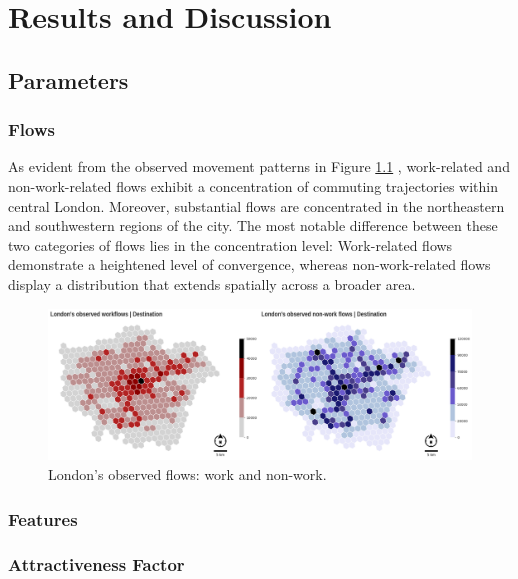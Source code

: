 \chapter{Results and Discussion}
\label{chapterlabel4}
    \section{Parameters}
        \subsection{Flows}

        As evident from the observed movement patterns in Figure \ref{fig: observedflows_overview} , work-related and non-work-related flows exhibit a concentration of commuting trajectories within central London. Moreover, substantial flows are concentrated in the northeastern and southwestern regions of the city. The most notable difference between these two categories of flows lies in the concentration level: Work-related flows demonstrate a heightened level of convergence, whereas non-work-related flows display a distribution that extends spatially across a broader area.

    \begin{figure}[H]
        \centering
        \includegraphics[width=15cm]{Images/Hex_observed_overview.png}
        \caption{London's observed flows: work and non-work.}
        \label{fig: observedflows_overview}
    \end{figure}

        \subsection{Features}


        

        \subsection{Attractiveness Factor}
        

